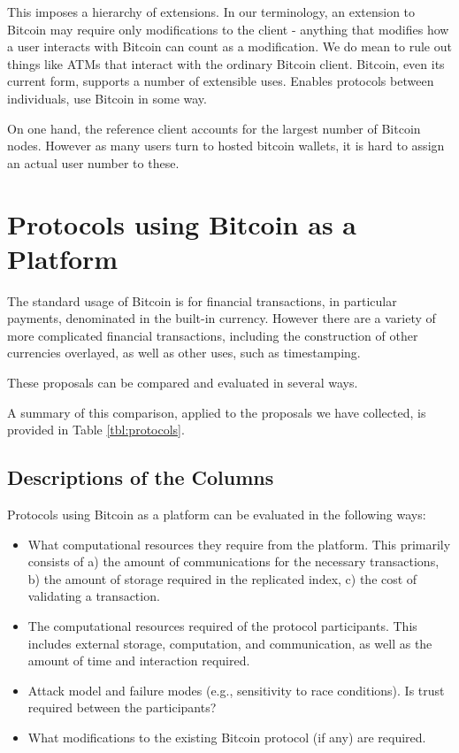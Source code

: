 This imposes a hierarchy of extensions. In our terminology, an extension to Bitcoin may require only modifications to the client - anything that modifies how a user interacts with Bitcoin can count as a modification. We do mean to rule out things like ATMs that interact with the ordinary Bitcoin client. Bitcoin, even its current form, supports a number of extensible uses. Enables protocols between individuals, use Bitcoin in some way.

On one hand, the reference client accounts for the largest number of Bitcoin nodes. However as many users turn to hosted bitcoin wallets, it is hard to assign an actual user number to these.



\section{ Protocols using Bitcoin as a Platform }

The standard usage of Bitcoin is for financial transactions, in particular payments, denominated in the built-in currency. However there are a variety of more complicated financial transactions, including the construction of other currencies overlayed, as well as other uses, such as timestamping.

These proposals can be compared and evaluated in several ways.

A summary of this comparison, applied to the proposals we have collected, is provided in Table \ref{tbl:protocols}.

\subsection{Descriptions of the Columns}
Protocols using Bitcoin as a platform can be evaluated in the following ways:
\begin{itemize}
\item What computational resources they require from the platform. This primarily consists of a) the amount of communications for the necessary transactions, b) the amount of storage required in the replicated index, c) the cost of validating a transaction.
\item The computational resources required of the protocol participants. This includes external storage, computation, and communication, as well as the amount of time and interaction required.
\item Attack model and failure modes (e.g., sensitivity to race conditions). Is trust required between the participants?
\item What modifications to the existing Bitcoin protocol (if any) are required.
\end{itemize}

